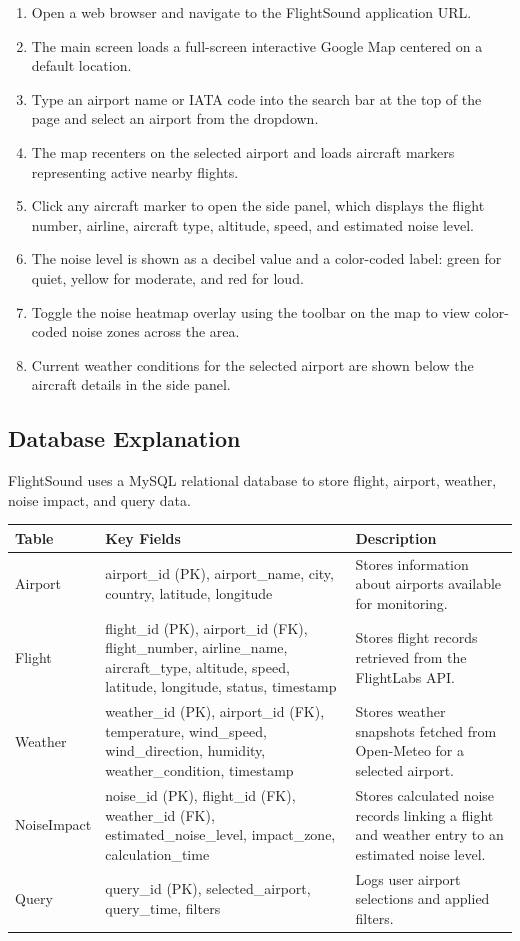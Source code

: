\documentclass[12pt]{article}
\begin{document}
\begin{enumerate}
\item Open a web browser and navigate to the FlightSound application URL.
\item The main screen loads a full-screen interactive Google Map centered on a default location.
\item Type an airport name or IATA code into the search bar at the top of the page and select an airport from the dropdown.
\item The map recenters on the selected airport and loads aircraft markers representing active nearby flights.
\item Click any aircraft marker to open the side panel, which displays the flight number, airline, aircraft type, altitude, speed, and estimated noise level.
\item The noise level is shown as a decibel value and a color-coded label: green for quiet, yellow for moderate, and red for loud.
\item Toggle the noise heatmap overlay using the toolbar on the map to view color-coded noise zones across the area.
\item Current weather conditions for the selected airport are shown below the aircraft details in the side panel.
\end{enumerate}

\subsection{Database Explanation}
FlightSound uses a MySQL relational database to store flight, airport, weather, noise impact, and query data.

\begin{tabular}{|l|p{4cm}|p{6cm}|}
\hline
Table & Key Fields & Description \\
\hline
Airport & airport\_id (PK), airport\_name, city, country, latitude, longitude & Stores information about airports available for monitoring. \\
\hline
Flight & flight\_id (PK), airport\_id (FK), flight\_number, airline\_name, aircraft\_type, altitude, speed, latitude, longitude, status, timestamp & Stores flight records retrieved from the FlightLabs API. \\
\hline
Weather & weather\_id (PK), airport\_id (FK), temperature, wind\_speed, wind\_direction, humidity, weather\_condition, timestamp & Stores weather snapshots fetched from Open-Meteo for a selected airport. \\
\hline
NoiseImpact & noise\_id (PK), flight\_id (FK), weather\_id (FK), estimated\_noise\_level, impact\_zone, calculation\_time & Stores calculated noise records linking a flight and weather entry to an estimated noise level. \\
\hline
Query & query\_id (PK), selected\_airport, query\_time, filters & Logs user airport selections and applied filters. \\
\hline
\end{tabular}
\end{document}
